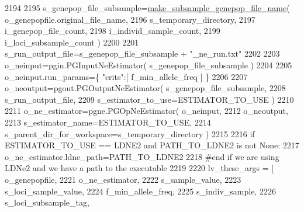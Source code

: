 \begin{DoxyCode}
2194                 
2195                 s\_genepop\_file\_subsample=\hyperlink{namespacenegui_1_1pgdriveneestimator_a9c650be4ed8ae5fa5e599523c22273bd}{make\_subsample\_genepop\_file\_name}( 
      o\_genepopfile.original\_file\_name,
2196                                                                                             
      s\_temporary\_directory, 
2197                                                                                             
      i\_genepop\_file\_count, 
2198                                                                                                 
      i\_individ\_sample\_count,
2199                                                                                                 
      i\_loci\_subsample\_count )
2200 
2201                 s\_run\_output\_file=s\_genepop\_file\_subsample + \textcolor{stringliteral}{"\_ne\_run.txt"}
2202 
2203                 o\_neinput=pgin.PGInputNeEstimator( s\_genepop\_file\_subsample )
2204 
2205                 o\_neinput.run\_params=\{ \textcolor{stringliteral}{"crits"}:[ f\_min\_allele\_freq ]  \}
2206 
2207                 o\_neoutput=pgout.PGOutputNeEstimator( s\_genepop\_file\_subsample, 
2208                                                         s\_run\_output\_file, 
2209                                                         s\_estimator\_to\_use=ESTIMATOR\_TO\_USE )   
2210                 
2211                 o\_ne\_estimator=pgne.PGOpNeEstimator( o\_neinput, 
2212                                                         o\_neoutput, 
2213                                                         s\_estimator\_name=ESTIMATOR\_TO\_USE,
2214                                                         s\_parent\_dir\_for\_workspace=s\_temporary\_directory ) 
2215                 
2216                 \textcolor{keywordflow}{if} ESTIMATOR\_TO\_USE == LDNE2 \textcolor{keywordflow}{and} PATH\_TO\_LDNE2 \textcolor{keywordflow}{is} \textcolor{keywordflow}{not} \textcolor{keywordtype}{None}:
2217                     o\_ne\_estimator.ldne\_path=PATH\_TO\_LDNE2
2218                 \textcolor{comment}{#end if we are using LDNe2 and we have a path to the executable}
2219 
2220                 lv\_these\_args = [ o\_genepopfile,  
2221                                     o\_ne\_estimator, 
2222                                     s\_sample\_value, 
2223                                     s\_loci\_sample\_value,
2224                                     f\_min\_allele\_freq, 
2225                                     s\_indiv\_sample, 
2226                                     s\_loci\_subsample\_tag,

\end{DoxyCode}
